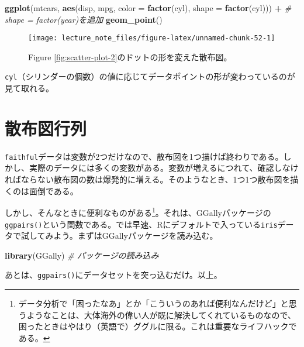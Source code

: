 \documentclass[]{book}
\newenvironment{Shaded}{\begin{snugshade}}{\end{snugshade}}
\newcommand{\KeywordTok}[1]{\textcolor[rgb]{0.13,0.29,0.53}{\textbf{#1}}}
\newcommand{\DataTypeTok}[1]{\textcolor[rgb]{0.13,0.29,0.53}{#1}}
\newcommand{\StringTok}[1]{\textcolor[rgb]{0.31,0.60,0.02}{#1}}
\newcommand{\CommentTok}[1]{\textcolor[rgb]{0.56,0.35,0.01}{\textit{#1}}}
\newcommand{\OperatorTok}[1]{\textcolor[rgb]{0.81,0.36,0.00}{\textbf{#1}}}
\newcommand{\NormalTok}[1]{#1}
\let\rmarkdownfootnote\footnote%
\def\footnote{\protect\rmarkdownfootnote}
\begin{document}
\begin{Shaded}
\begin{Highlighting}[]
\KeywordTok{ggplot}\NormalTok{(mtcars, }\KeywordTok{aes}\NormalTok{(disp, mpg, }\DataTypeTok{color =} \KeywordTok{factor}\NormalTok{(cyl), }\DataTypeTok{shape =} \KeywordTok{factor}\NormalTok{(cyl))) }\OperatorTok{+}\StringTok{ }\CommentTok{# shape = factor(year)を追加}
\StringTok{  }\KeywordTok{geom_point}\NormalTok{()}
\end{Highlighting}
\end{Shaded}

\begin{figure}

{\centering \texttt{[image: lecture\_note\_files/figure-latex/unnamed-chunk-52-1]} 

}

\caption{Figure
\ref{fig:scatter-plot-2}のドットの形を変えた散布図。}\label{fig:unnamed-chunk-52}
\end{figure}

\texttt{cyl}（シリンダーの個数）の値に応じてデータポイントの形が変わっているのが見て取れる。

\section{散布図行列}

\texttt{faithful}データは変数が2つだけなので、散布図を1つ描けば終わりである。しかし、実際のデータには多くの変数がある。変数が増えるにつれて、確認しなければならない散布図の数は爆発的に増える。そのようなとき、1つ1つ散布図を描くのは面倒である。

しかし、そんなときに便利なものがある\footnote{データ分析で「困ったなあ」とか「こういうのあれば便利なんだけど」と思うようなことは、大体海外の偉い人が既に解決してくれているものなので、困ったときはやはり（英語で）ググルに限る。これは重要なライフハックである。}。それは、GGallyパッケージの\texttt{ggpairs()}という関数である。では早速、Rにデフォルトで入っている\texttt{iris}データで試してみよう。まずはGGallyパッケージを読み込む。

\begin{Shaded}
\begin{Highlighting}[]
\KeywordTok{library}\NormalTok{(GGally) }\CommentTok{# パッケージの読み込み}
\end{Highlighting}
\end{Shaded}

あとは、\texttt{ggpairs()}にデータセットを突っ込むだけ。以上。
\end{document}
